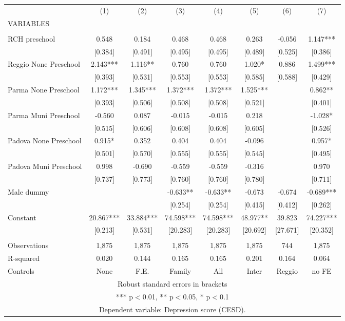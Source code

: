 \begin{tabular}{lccccccc} \hline
 & (1) & (2) & (3) & (4) & (5) & (6) & (7) \\
VARIABLES &  &  &  &  &  &  &  \\ \hline
 &  &  &  &  &  &  &  \\
RCH preschool & 0.548 & 0.184 & 0.468 & 0.468 & 0.263 & -0.056 & 1.147*** \\
 & [0.384] & [0.491] & [0.495] & [0.495] & [0.489] & [0.525] & [0.386] \\
Reggio None Preschool & 2.143*** & 1.116** & 0.760 & 0.760 & 1.020* & 0.886 & 1.499*** \\
 & [0.393] & [0.531] & [0.553] & [0.553] & [0.585] & [0.588] & [0.429] \\
Parma None Preschool & 1.172*** & 1.345*** & 1.372*** & 1.372*** & 1.525*** &  & 0.862** \\
 & [0.393] & [0.506] & [0.508] & [0.508] & [0.521] &  & [0.401] \\
Parma Muni Preschool & -0.560 & 0.087 & -0.015 & -0.015 & 0.218 &  & -1.028* \\
 & [0.515] & [0.606] & [0.608] & [0.608] & [0.605] &  & [0.526] \\
Padova None Preschool & 0.915* & 0.352 & 0.404 & 0.404 & -0.096 &  & 0.957* \\
 & [0.501] & [0.570] & [0.555] & [0.555] & [0.545] &  & [0.495] \\
Padova Muni Preschool & 0.998 & -0.690 & -0.559 & -0.559 & -0.316 &  & 0.970 \\
 & [0.737] & [0.773] & [0.760] & [0.760] & [0.780] &  & [0.711] \\
Male dummy &  &  & -0.633** & -0.633** & -0.673 & -0.674 & -0.689*** \\
 &  &  & [0.254] & [0.254] & [0.415] & [0.412] & [0.262] \\
Constant & 20.867*** & 33.884*** & 74.598*** & 74.598*** & 48.977** & 39.823 & 74.227*** \\
 & [0.213] & [0.531] & [20.283] & [20.283] & [20.692] & [27.671] & [20.352] \\
 &  &  &  &  &  &  &  \\
Observations & 1,875 & 1,875 & 1,875 & 1,875 & 1,875 & 744 & 1,875 \\
R-squared & 0.020 & 0.144 & 0.165 & 0.165 & 0.201 & 0.164 & 0.064 \\
 Controls & None & F.E. & Family & All & Inter & Reggio & no FE \\ \hline
\multicolumn{8}{c}{ Robust standard errors in brackets} \\
\multicolumn{8}{c}{ *** p$<$0.01, ** p$<$0.05, * p$<$0.1} \\
\multicolumn{8}{c}{ Dependent variable: Depression score (CESD).} \\
\end{tabular}
